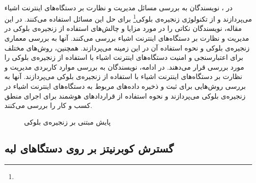 \paragraph{}{
    در \cite{s19040856}،
    نویسندگان به بررسی مسائل مدیریت و نظارت بر دستگاه‌های اینترنت اشیاء می‌پردازند
    و از تکنولوژی زنجیره‌ی بلوکی\footnote{} برای حل این مسائل استفاده می‌کنند. 
    در این مقاله، نویسندگان نکاتی را در مورد مزایا و چالش‌های استفاده از زنجیره‌ی بلوکی در مدیریت 
    و نظارت بر دستگاه‌های اینترنت اشیاء بررسی می‌کنند. آنها به بررسی معماری زنجیره‌ی بلوکی و
    نحوه استفاده آن در این زمینه می‌پردازند. همچنین، روش‌های مختلف برای اعتبارسنجی و امنیت 
    دستگاه‌های اینترنت اشیاء با استفاده از زنجیره‌ی بلوکی را مورد بررسی قرار می‌دهند. در ادامه، 
    نویسندگان به بررسی موارد کاربردی مدیریت و نظارت بر دستگاه‌های اینترنت اشیاء با استفاده
    از زنجیره‌ی بلوکی می‌پردازند. آنها به بررسی روش‌هایی برای ثبت و ذخیره داده‌های مربوط به 
    دستگاه‌های اینترنت اشیاء در زنجیره‌ی بلوکی می‌پردازند و نحوه استفاده از قراردادهای هوشمند
    برای اجرای منطق کسب و کار را بررسی می‌کنند.
    \begin{figure}[H]
        \caption{پایش مبتنی بر زنجیره‌ی بلوکی \cite{s19040856}}
        \label{fig:blockchain_monitoring}
    \end{figure}
}

\subsection{
    گسترش کوبرنیتز بر روی دستگا‌های لبه
}
\label{subsec:extending_kubernetes_to_edge}
